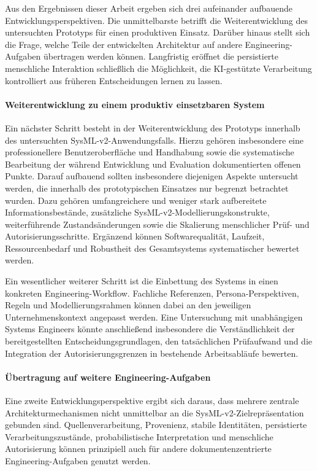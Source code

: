Aus den Ergebnissen dieser Arbeit ergeben sich drei aufeinander aufbauende
Entwicklungsperspektiven. Die unmittelbarste betrifft die Weiterentwicklung
des untersuchten Prototyps für einen produktiven Einsatz. Darüber hinaus
stellt sich die Frage, welche Teile der entwickelten Architektur auf andere
Engineering-Aufgaben übertragen werden können. Langfristig eröffnet die
persistierte menschliche Interaktion schließlich die Möglichkeit, die
KI-gestützte Verarbeitung kontrolliert aus früheren Entscheidungen lernen zu
lassen.

\paragraph{Weiterentwicklung zu einem produktiv einsetzbaren System}

Ein nächster Schritt besteht in der Weiterentwicklung des Prototyps innerhalb
des untersuchten SysML-v2-Anwendungsfalls. Hierzu gehören insbesondere eine
professionellere Benutzeroberfläche und Handhabung sowie die systematische
Bearbeitung der während Entwicklung und Evaluation dokumentierten offenen
Punkte.
\newpage
Darauf aufbauend sollten insbesondere diejenigen Aspekte untersucht werden,
die innerhalb des prototypischen Einsatzes nur begrenzt betrachtet wurden.
Dazu gehören umfangreichere und weniger stark aufbereitete
Informationsbestände, zusätzliche SysML-v2-Modellierungskonstrukte,
weiterführende Zustandsänderungen sowie die Skalierung menschlicher Prüf- und
Autorisierungsschritte. Ergänzend können Softwarequalität, Laufzeit,
Ressourcenbedarf und Robustheit des Gesamtsystems systematischer bewertet
werden.

Ein wesentlicher weiterer Schritt ist die Einbettung des Systems in einen
konkreten Engineering-Workflow. Fachliche Referenzen, Persona-Perspektiven,
Regeln und Modellierungsrahmen können dabei an den jeweiligen
Unternehmenskontext angepasst werden. Eine Untersuchung mit unabhängigen
Systems Engineers könnte anschließend insbesondere die Verständlichkeit der
bereitgestellten Entscheidungsgrundlagen, den tatsächlichen Prüfaufwand und
die Integration der Autorisierungsgrenzen in bestehende Arbeitsabläufe
bewerten.

\paragraph{Übertragung auf weitere Engineering-Aufgaben}

Eine zweite Entwicklungsperspektive ergibt sich daraus, dass mehrere zentrale
Architekturmechanismen nicht unmittelbar an die SysML-v2-Zielrepräsentation
gebunden sind. Quellenverarbeitung, Provenienz, stabile Identitäten,
persistierte Verarbeitungszustände, probabilistische Interpretation und
menschliche Autorisierung können prinzipiell auch für andere
dokumentenzentrierte Engineering-Aufgaben genutzt werden.

